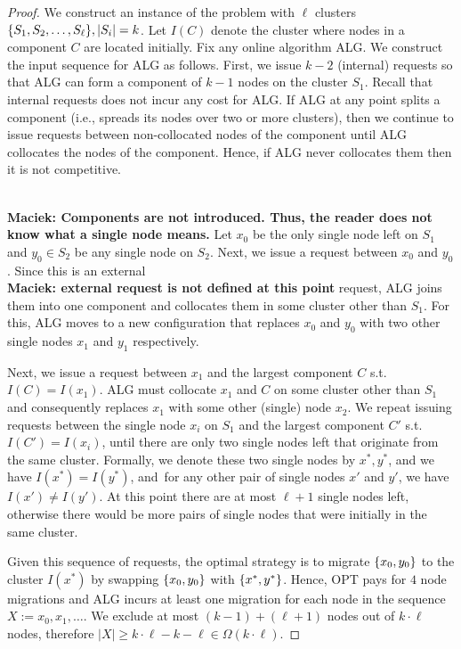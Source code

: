 \documentclass[manuscript,screen=true]{acmart}
\newcommand{\ALG}{ALG}
\newcommand{\PPOBRP}{PP-BRP}
\DeclarePairedDelimiter\set{\{}{\}}
\newcommand\maciek[1]{\color{brown}\textbf{\\ Maciek: #1}\color{black}}
\begin{document}
\begin{proof}
	We construct an instance of the problem with $\ell$ clusters 
	$\set{ S_1, S_2,\dots , S_{\ell}}, |S_i|  = k$.
	Let $I(C)$ denote the cluster where nodes in a component $C$ are located initially.
	Fix any online algorithm \ALG{}.
	We construct the input sequence for \ALG{} as follows.
	First,
	we issue $k-2$ (internal) requests so that \ALG{} can form a component of $k-1$
	nodes on the cluster $S_1$.
	Recall that internal requests does not incur any cost for \ALG{}.
	If \ALG{} at any point splits a component
	(i.e., spreads its nodes over two or more clusters),
	then we continue to issue requests between non-collocated nodes of the component until \ALG{} collocates the nodes of the component.
	Hence, if \ALG{} never collocates them then it is not competitive.
  
  \maciek{Components are not introduced. Thus, the reader does not know what a single node means.}
	Let $x_0$  be the only single node left on $S_1$ and  $y_0 \in S_2$ be any single node on $S_2$.
	Next,
	we issue a request between $x_0$ and $y_0$.
	Since this is an external \maciek{external request is not defined at this point} request,
	\ALG{} joins them into one component and collocates them in some cluster other than $S_1$.
	For this,
	\ALG{} moves to a new configuration
	that replaces $x_0$ and $y_0$ with two other single nodes $x_1$ and $y_1$ respectively.
	
	Next,
	we issue a request between $x_1$ and the largest component $C$ s.t.~$I(C) = I(x_1)$.
	\ALG{} must collocate $x_1$ and $C$ on some cluster other than $S_1$ and
	consequently replaces $x_1$ with some other (single) node $x_2$.
	We repeat issuing requests between the single node $x_i$ on $S_1$ and the largest component $C'$ s.t.~$I(C')=I(x_i)$,
  until there are only two single nodes left that  originate from the same cluster.
	Formally, we denote these two single nodes by $x^*, y^*$, and we have $I(x^*) = I(y^*)$, and~for any other pair of single nodes
	$x'$ and $y'$,
	we have $I(x') \neq I(y')$.
	At this point there are at most $\ell+1$ single nodes left,
	otherwise there would be more pairs of single nodes that were initially in the same cluster.
	
	Given this sequence of requests,
	the optimal strategy is to migrate $\set{x_0,y_0}$ to the cluster $I(x^*)$ by
	swapping $\set{x_0,y_0}$ with $\set{x^*,y^*}$.
	Hence,
	OPT pays for $4$ node migrations and
	\ALG{} incurs at least one migration for each node in the sequence $X := x_0, x_1,\dots$.
	We exclude at most $(k-1) + ( \ell+1)$ nodes out of $k \cdot \ell$ nodes,
	therefore $|X| \geq k \cdot \ell - k - \ell \in \Omega(k\cdot\ell)$.
\end{proof}
\end{document}
